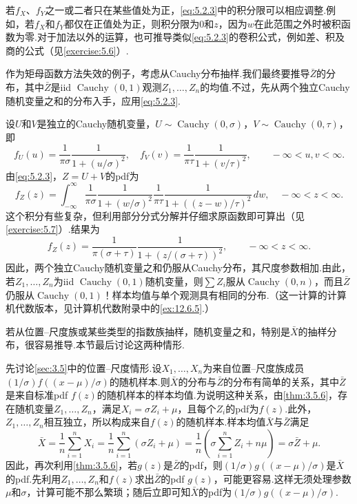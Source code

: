 若$f_X$、$f_Y$之一或二者只在某些值处为正，\eqref{eq:5.2.3}中的积分限可以相应调整.例如，若$f_X$和$f_Y$都仅在正值处为正，则积分限为0和$z$，因为$w$在此范围之外时被积函数为零.对于加法以外的运算，也可推导类似\eqref{eq:5.2.3}的卷积公式，例如差、积及商的公式（见\autoref{exercise:5.6}）.
\begin{example}[Cauchy随机变量之和]\label{ex:5.2.10}
作为矩母函数方法失效的例子，考虑从Cauchy分布抽样.我们最终要推导$\bar Z$的分布，其中$\bar Z$是iid $\operatorname{Cauchy}(0,1)$观测$Z_1,\ldots,Z_n$的均值.不过，先从两个独立Cauchy随机变量之和的分布入手，应用\eqref{eq:5.2.3}.

设$U$和$V$是独立的Cauchy随机变量，$U\sim\operatorname{Cauchy}(0,\sigma)$，$V\sim\operatorname{Cauchy}(0,\tau)$，即
$$f_U(u)=\frac1{\pi\sigma}\frac1{1+(u/\sigma)^2},\quad f_V(v)=\frac1{\pi\tau}\frac1{1+(v/\tau)^2},\qquad -\infty<u,v<\infty.$$
由\eqref{eq:5.2.3}，$Z=U+V$的pdf为
\begin{equation}\label{eq:5.2.4}
f_Z(z)=\int_{-\infty}^\infty\frac1{\pi\sigma}\frac1{1+(w/\sigma)^2}\frac1{\pi\tau}\frac1{1+((z-w)/\tau)^2}\,dw,\quad -\infty<z<\infty.
\end{equation}
这个积分有些复杂，但利用部分分式分解并仔细求原函数即可算出（见\autoref{exercise:5.7}）.结果为
\begin{equation}\label{eq:5.2.5}
f_Z(z)=\frac1{\pi(\sigma+\tau)}\frac1{1+(z/(\sigma+\tau))^2},\qquad -\infty<z<\infty.
\end{equation}
因此，两个独立Cauchy随机变量之和仍服从Cauchy分布，其尺度参数相加.由此，若$Z_1,\ldots,Z_n$为iid $\operatorname{Cauchy}(0,1)$随机变量，则$\sum Z_i$服从$\operatorname{Cauchy}(0,n)$，而且$\bar Z$仍服从$\operatorname{Cauchy}(0,1)$！样本均值与单个观测具有相同的分布.（这一计算的计算机代数版本，见计算机代数附录中的\autoref{ex:12.6.5}.）
\end{example}
若从位置–尺度族或某些类型的指数族抽样，随机变量之和，特别是$\bar X$的抽样分布，很容易推导.本节最后讨论这两种情形.

先讨论\autoref{sec:3.5}中的位置–尺度情形.设$X_1,\ldots,X_n$为来自位置–尺度族成员$(1/\sigma)\allowbreak f((x-\mu)/\sigma)$的随机样本.则$\bar X$的分布与$\bar Z$的分布有简单的关系，其中$\bar Z$是来自标准pdf $f(z)$的随机样本的样本均值.为说明这种关系，由\autoref{thm:3.5.6}，存在随机变量$Z_1,\ldots,Z_n$，满足$X_i=\sigma Z_i+\mu$，且每个$Z_i$的pdf为$f(z)$.此外，$Z_1,\ldots,Z_n$相互独立，所以构成来自$f(z)$的随机样本.样本均值$\bar X$与$\bar Z$满足
$$\bar X=\frac1n\sum_{i=1}^nX_i=\frac1n\sum_{i=1}^n(\sigma Z_i+\mu)=\frac1n\left(\sigma\sum_{i=1}^nZ_i+n\mu\right)=\sigma\bar Z+\mu.$$
因此，再次利用\autoref{thm:3.5.6}，若$g(z)$是$\bar Z$的pdf，则$(1/\sigma)g((x-\mu)/\sigma)$是$\bar X$的pdf.先利用$Z_1,\ldots,Z_n$和$f(z)$求出$\bar Z$的pdf $g(z)$，可能更容易.这样无须处理参数$\mu$和$\sigma$，计算可能不那么繁琐；随后立即可知$\bar X$的pdf为$(1/\sigma)g((x-\mu)/\sigma)$.

